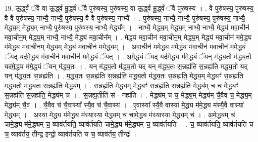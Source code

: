 \documentclass[17pt]{extarticle}
\begin{document}
19. ऊ॒र्द्ध्वं ॅवै वा ऊ॒र्द्ध्व मू॒र्द्ध्वं ॅवै पुरु॑षस्य॒ पुरु॑षस्य॒ वा ऊ॒र्द्ध्व मू॒र्द्ध्वं ॅवै पुरु॑षस्य । . वै पुरु॑षस्य॒ पुरु॑षस्य॒ वै वै पुरु॑षस्य॒ नाभ्यै॒ नाभ्यै॒ पुरु॑षस्य॒ वै वै पुरु॑षस्य॒ नाभ्यै᳚ । . पुरु॑षस्य॒ नाभ्यै॒ नाभ्यै॒ पुरु॑षस्य॒ पुरु॑षस्य॒ नाभ्यै॒ मेद्ध्य॒म् मेद्ध्य॒म् नाभ्यै॒ पुरु॑षस्य॒ पुरु॑षस्य॒ नाभ्यै॒ मेद्ध्य᳚म् । . नाभ्यै॒ मेद्ध्य॒म् मेद्ध्य॒म् नाभ्यै॒ नाभ्यै॒ मेद्ध्य॑ मवा॒चीन॑ मवा॒चीन॒म् मेद्ध्य॒म् नाभ्यै॒ नाभ्यै॒ मेद्ध्य॑ मवा॒चीन᳚म् । . मेद्ध्य॑ मवा॒चीन॑ मवा॒चीन॒म् मेद्ध्य॒म् मेद्ध्य॑ मवा॒चीन॑ ममे॒द्ध्य म॑मे॒द्ध्य म॑वा॒चीन॒म् मेद्ध्य॒म् मेद्ध्य॑ मवा॒चीन॑ ममे॒द्ध्यम् । . अ॒वा॒चीन॑ ममे॒द्ध्य म॑मे॒द्ध्य म॑वा॒चीन॑ मवा॒चीन॑ ममे॒द्ध्यं ॅयद् यद॑मे॒द्ध्य म॑वा॒चीन॑ मवा॒चीन॑ ममे॒द्ध्यं ॅयत् । . अ॒मे॒द्ध्यं ॅयद् यद॑मे॒द्ध्य म॑मे॒द्ध्यं ॅयन् म॑द्ध्य॒तो म॑द्ध्य॒तो यद॑मे॒द्ध्य म॑मे॒द्ध्यं ॅयन् म॑द्ध्य॒तः । . यन् म॑द्ध्य॒तो म॑द्ध्य॒तो यद् यन् म॑द्ध्य॒तः स॒न्नह्य॑ति स॒न्नह्य॑ति मद्ध्य॒तो यद् यन् म॑द्ध्य॒तः स॒न्नह्य॑ति । . म॒द्ध्य॒तः स॒न्नह्य॑ति स॒न्नह्य॑ति मद्ध्य॒तो म॑द्ध्य॒तः स॒न्नह्य॑ति॒ मेद्ध्य॒म् मेद्ध्यꣳ॑ स॒न्नह्य॑ति मद्ध्य॒तो म॑द्ध्य॒तः स॒न्नह्य॑ति॒ मेद्ध्य᳚म् । . स॒न्नह्य॑ति॒ मेद्ध्य॒म् मेद्ध्यꣳ॑ स॒न्नह्य॑ति स॒न्नह्य॑ति॒ मेद्ध्य॑म् च च॒ मेद्ध्यꣳ॑ स॒न्नह्य॑ति स॒न्नह्य॑ति॒ मेद्ध्य॑म् च । . स॒न्नह्य॒तीति॑ सं - नह्य॑ति । . मेद्ध्य॑म् च च॒ मेद्ध्य॒म् मेद्ध्य॑म् चै॒वैव च॒ मेद्ध्य॒म् मेद्ध्य॑म् चै॒व । . चै॒वैव च॑ चै॒वास्या᳚ स्यै॒व च॑ चै॒वास्य॑ । . ए॒वास्या᳚ स्यै॒वै वास्या॑ मे॒द्ध्य म॑मे॒द्ध्य म॑स्यै॒वै वास्या॑ मे॒द्ध्यम् । . अ॒स्या॒ मे॒द्ध्य म॑मे॒द्ध्य म॑स्यास्या मे॒द्ध्यम् च॑ चामे॒द्ध्य म॑स्यास्या मे॒द्ध्यम् च॑ । . अ॒मे॒द्ध्यम् च॑ चामे॒द्ध्य म॑मे॒द्ध्यम् च॒ व्याव॑र्तयति॒ व्याव॑र्तयति चामे॒द्ध्य म॑मे॒द्ध्यम् च॒ व्याव॑र्तयति । . च॒ व्याव॑र्तयति॒ व्याव॑र्तयति च च॒ व्याव॑र्तय॒ तीन्द्र॒ इन्द्रो॒ व्याव॑र्तयति च च॒ व्याव॑र्तय॒ तीन्द्रः॑ । \newline
\end{document}
